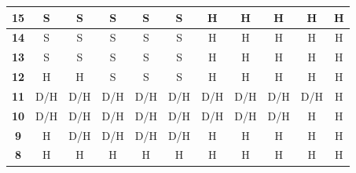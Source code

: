 \documentclass[conference]{IEEEtran}
\begin{document}
\begin{table}[htbp]
\begin{tabular}{|c|c|c|c|c|c|c|c|c|c|c|}
\textbf{15} & \cellcolor[HTML]{32CB00}S & \cellcolor[HTML]{32CB00}S & \cellcolor[HTML]{32CB00}S & \cellcolor[HTML]{32CB00}S & \cellcolor[HTML]{32CB00}S & \cellcolor[HTML]{FE0000}H & \cellcolor[HTML]{FE0000}H & \cellcolor[HTML]{FE0000}H & \cellcolor[HTML]{FE0000}H & \cellcolor[HTML]{FE0000}H \\ \hline
\textbf{14} & \cellcolor[HTML]{32CB00}S & \cellcolor[HTML]{32CB00}S & \cellcolor[HTML]{32CB00}S & \cellcolor[HTML]{32CB00}S & \cellcolor[HTML]{32CB00}S & \cellcolor[HTML]{FE0000}H & \cellcolor[HTML]{FE0000}H & \cellcolor[HTML]{FE0000}H & \cellcolor[HTML]{FE0000}H & \cellcolor[HTML]{FE0000}H \\ \hline
\textbf{13} & \cellcolor[HTML]{32CB00}S & \cellcolor[HTML]{32CB00}S & \cellcolor[HTML]{32CB00}S & \cellcolor[HTML]{32CB00}S & \cellcolor[HTML]{32CB00}S & \cellcolor[HTML]{FE0000}H & \cellcolor[HTML]{FE0000}H & \cellcolor[HTML]{FE0000}H & \cellcolor[HTML]{FE0000}H & \cellcolor[HTML]{FE0000}H \\ \hline
\textbf{12} & \cellcolor[HTML]{FE0000}H & \cellcolor[HTML]{FE0000}H & \cellcolor[HTML]{32CB00}S & \cellcolor[HTML]{32CB00}S & \cellcolor[HTML]{32CB00}S & \cellcolor[HTML]{FE0000}H & \cellcolor[HTML]{FE0000}H & \cellcolor[HTML]{FE0000}H & \cellcolor[HTML]{FE0000}H & \cellcolor[HTML]{FE0000}H \\ \hline
\textbf{11} & \cellcolor[HTML]{FFC702}D/H & \cellcolor[HTML]{FFC702}D/H & \cellcolor[HTML]{FFC702}D/H & \cellcolor[HTML]{FFC702}D/H & \cellcolor[HTML]{FFC702}D/H & \cellcolor[HTML]{FFC702}D/H & \cellcolor[HTML]{FFC702}D/H & \cellcolor[HTML]{FFC702}D/H & \cellcolor[HTML]{FFC702}D/H & \cellcolor[HTML]{FE0000}H \\ \hline
\textbf{10} & \cellcolor[HTML]{FFC702}D/H & \cellcolor[HTML]{FFC702}D/H & \cellcolor[HTML]{FFC702}D/H & \cellcolor[HTML]{FFC702}D/H & \cellcolor[HTML]{FFC702}D/H & \cellcolor[HTML]{FFC702}D/H & \cellcolor[HTML]{FFC702}D/H & \cellcolor[HTML]{FFC702}D/H & \cellcolor[HTML]{FE0000}H & \cellcolor[HTML]{FE0000}H \\ \hline
\textbf{9} & \cellcolor[HTML]{FE0000}H & \cellcolor[HTML]{FFC702}D/H & \cellcolor[HTML]{FFC702}D/H & \cellcolor[HTML]{FFC702}D/H & \cellcolor[HTML]{FFC702}D/H & \cellcolor[HTML]{FE0000}H & \cellcolor[HTML]{FE0000}H & \cellcolor[HTML]{FE0000}H & \cellcolor[HTML]{FE0000}H & \cellcolor[HTML]{FE0000}H \\ \hline
\textbf{8} & \cellcolor[HTML]{FE0000}H & \cellcolor[HTML]{FE0000}H & \cellcolor[HTML]{FE0000}H & \cellcolor[HTML]{FE0000}H & \cellcolor[HTML]{FE0000}H & \cellcolor[HTML]{FE0000}H & \cellcolor[HTML]{FE0000}H & \cellcolor[HTML]{FE0000}H & \cellcolor[HTML]{FE0000}H & \cellcolor[HTML]{FE0000}H \\ \hline

\end{tabular}
\end{table}
\end{document}
